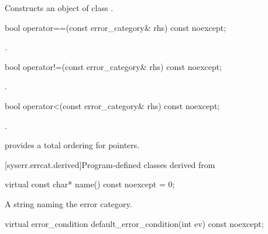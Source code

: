 \begin{itemdescr}
\pnum
\effects Constructs an object of class .
\end{itemdescr}

%
\begin{itemdecl}
bool operator==(const error_category& rhs) const noexcept;
\end{itemdecl}

\begin{itemdescr}
\pnum
\returns {}.
\end{itemdescr}

%
\begin{itemdecl}
bool operator!=(const error_category& rhs) const noexcept;
\end{itemdecl}

\begin{itemdescr}
\pnum
\returns {}.
\end{itemdescr}

%
\begin{itemdecl}
bool operator<(const error_category& rhs) const noexcept;
\end{itemdecl}

\begin{itemdescr}
\pnum
\returns {}.

\begin{note}  provides a total ordering for pointers. \end{note}
\end{itemdescr}

[syserr.errcat.derived]{Program-defined classes derived from }

%
\begin{itemdecl}
virtual const char* name() const noexcept = 0;
\end{itemdecl}

\begin{itemdescr}
\pnum
\returns A string naming the error category.
\end{itemdescr}

%
\begin{itemdecl}
virtual error_condition default_error_condition(int ev) const noexcept;
\end{itemdecl}


